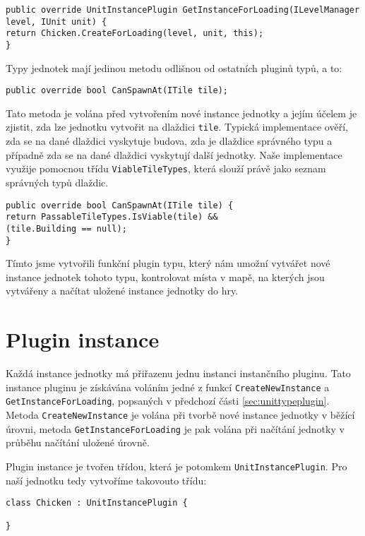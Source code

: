\begin{lstlisting}
public override UnitInstancePlugin GetInstanceForLoading(ILevelManager level, IUnit unit) {
return Chicken.CreateForLoading(level, unit, this);
}
\end{lstlisting}

Typy jednotek mají jedinou metodu odlišnou od ostatních pluginů typů, a to:

\begin{lstlisting}
public override bool CanSpawnAt(ITile tile);
\end{lstlisting}

Tato metoda je volána před vytvořením nové instance jednotky a jejím účelem je zjistit, zda lze jednotku vytvořit na dlaždici \texttt{tile}. Typická implementace ověří, zda se na dané dlaždici vyskytuje budova, zda je dlaždice správného typu a případně zda se na dané dlaždici vyskytují další jednotky. Naše implementace využije pomocnou třídu \texttt{ViableTileTypes}, která slouží právě jako seznam správných typů dlaždic.

\begin{lstlisting}
public override bool CanSpawnAt(ITile tile) {
return PassableTileTypes.IsViable(tile) && 
(tile.Building == null);
}
\end{lstlisting}

Tímto jsme vytvořili funkční plugin typu, který nám umožní vytvářet nové instance jednotek tohoto typu, kontrolovat místa v mapě, na kterých jsou vytvářeny a načítat uložené instance jednotky do hry.

\section{Plugin instance}

Každá instance jednotky má přiřazenu jednu instanci instančního pluginu. Tato instance pluginu je získávána voláním jedné z funkcí \texttt{CreateNewInstance} a \texttt{GetInstanceForLoading}, popsaných v předchozí části \ref{sec:unittypeplugin}. Metoda \texttt{CreateNewInstance} je volána při tvorbě nové instance jednotky v běžící úrovni, metoda \texttt{GetInstanceForLoading} je pak volána při načítání jednotky v průběhu načítání uložené úrovně.

Plugin instance je tvořen třídou, která je potomkem \texttt{UnitInstancePlugin}. Pro naší jednotku tedy vytvoříme takovouto třídu:

\begin{lstlisting}
class Chicken : UnitInstancePlugin {

}
\end{lstlisting}

